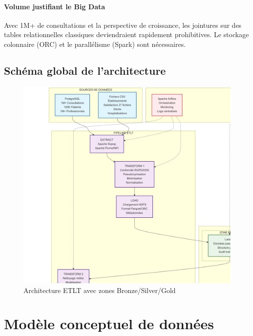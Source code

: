 \documentclass[12pt,a4paper]{article}
\begin{document}
\paragraph{Volume justifiant le Big Data}
Avec 1M+ de consultations et la perspective de croissance, les jointures sur des tables relationnelles classiques deviendraient rapidement prohibitives. Le stockage colonnaire (ORC) et le parallélisme (Spark) sont nécessaires.

\subsection{Schéma global de l'architecture}

\begin{figure}[H]
\centering
\includegraphics[width=\textwidth]{archi_etlt.png}
\caption{Architecture ETLT avec zones Bronze/Silver/Gold}
\label{fig:architecture_etlt}
\end{figure}



\newpage
\section{Modèle conceptuel de données}
\end{document}
